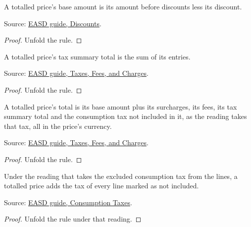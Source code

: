 \begin{theorem}
  \label{thm:offers-price-base}
  A totalled price's base amount is its amount before discounts less its
  discount.

  Source: \href{https://standards.atlassian.net/wiki/spaces/EASD/pages/574849038/Discounts}{EASD guide, Discounts}.
\end{theorem}
\begin{proof}
  Unfold the rule.
\end{proof}

\begin{theorem}
  \label{thm:offers-price-tax-total}
  A totalled price's tax summary total is the sum of its entries.

  Source: \href{https://standards.atlassian.net/wiki/spaces/EASD/pages/574455915/Taxes+Fees+and+Charges}{EASD guide, Taxes, Fees, and Charges}.
\end{theorem}
\begin{proof}
  Unfold the rule.
\end{proof}

\begin{theorem}
  \label{thm:offers-price-total-adds}
  A totalled price's total is its base amount plus its surcharges, its
  fees, its tax summary total and the consumption tax not included in it,
  as the reading takes that tax, all in the price's currency.

  Source: \href{https://standards.atlassian.net/wiki/spaces/EASD/pages/574455915/Taxes+Fees+and+Charges}{EASD guide, Taxes, Fees, and Charges}.
\end{theorem}
\begin{proof}
  Unfold the rule.
\end{proof}

\begin{theorem}
  \label{thm:offers-price-lines-reading}
  Under the reading that takes the excluded consumption tax from the lines,
  a totalled price adds the tax of every line marked as not included.

  Source: \href{https://standards.atlassian.net/wiki/spaces/EASD/pages/2588377182/Consumption+Taxes}{EASD guide, Consumption Taxes}.
\end{theorem}
\begin{proof}
  Unfold the rule under that reading.
\end{proof}

